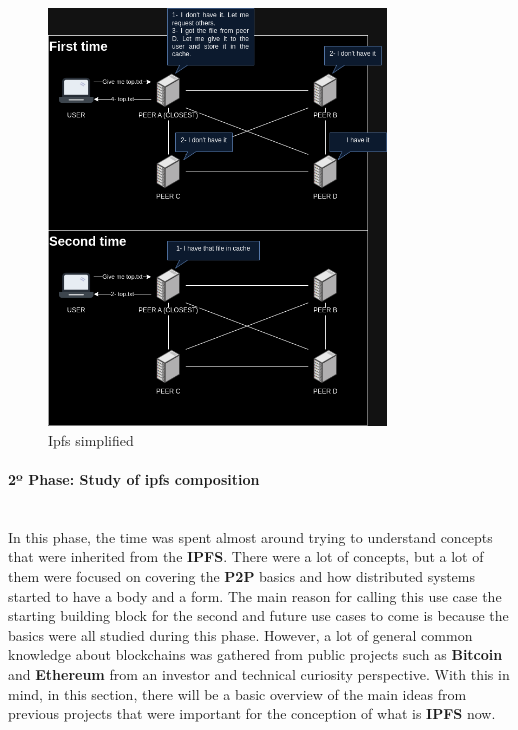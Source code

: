 \begin{figure}[H]
    \centering
    \includegraphics[width=0.8\textwidth]{assets/use-case-1/ipfs-behavior.drawio.png} %
    \caption{Ipfs simplified}
    \label{fig:sample-image} 
\end{figure}

\paragraph{2º Phase: Study of ipfs composition}\mbox{}\\
In this phase, the time was spent almost around trying to understand concepts that were inherited from the \textbf{IPFS}. There were a lot of concepts, but a lot of them were focused on covering the \textbf{P2P} basics and how distributed systems started to have a body and a form. The main reason for calling this use case the starting building block for the second and future use cases to come is because the basics were all studied during this phase. However, a lot of general common knowledge about blockchains was gathered from public projects such as \textbf{Bitcoin} and \textbf{Ethereum} from an investor and technical curiosity perspective. With this in mind, in this section, there will be a basic overview of the main ideas from previous projects that were important for the conception of what is \textbf{IPFS} now.


